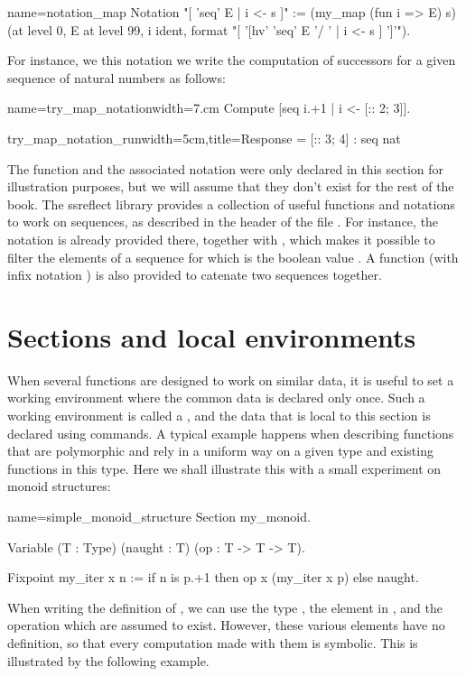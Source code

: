 \begin{coq}{name=notation_map}{}
Notation "[ 'seq' E | i <- s ]" := (my_map (fun i => E) s)
  (at level 0, E at level 99, i ident,
   format "[ '[hv' 'seq' E '/ ' | i <- s  ] ']'").
\end{coq}
For instance, we this notation we write the computation of successors
for a given sequence of natural numbers as follows:

\begin{coq}{name=try_map_notation}{width=7.cm}
Compute [seq i.+1 | i <- [:: 2; 3]].
\end{coq}
\begin{coqout}{try_map_notation_run}{width=5cm,title=Response}
= [:: 3; 4] : seq nat
\end{coqout}
The function  and the associated notation were only declared
in this section for illustration purposes, but we will assume that
they don't exist for the rest of the book.  The ssreflect library
provides a collection of useful functions and notations to work on
sequences, as described in the header of the file .  For
instance, the notation \C{[seq F | i <- s]} is already provided there,
together with \C{[seq i | i < s | p]}, which makes it possible to
filter the elements of a sequence for which  is the boolean
value .  A function  (with infix notation \C{++}) is
also provided to catenate two sequences together.

\section{Sections and local environments}
When several functions are designed to work on similar data, it is
useful to set a working environment where the common data is declared
only once.  Such a working environment is called a , and
the data that is local to this section is declared using 
commands.  A typical example happens when describing functions that
are polymorphic and rely in a uniform way on a given type and existing
functions in this type.  Here we shall illustrate this with a small
experiment on monoid structures:

\begin{coq}{name=simple_monoid_structure}{}
Section my_monoid.

Variable (T : Type) (naught : T) (op : T -> T -> T).

Fixpoint my_iter x n :=
  if n is p.+1 then op x (my_iter x p) else naught.
\end{coq}
When writing the definition of , we can use the type
, the element in , and the operation  which are
assumed to exist.  However, these various elements have no
definition, so that every computation made with them is symbolic.
This is illustrated by the following example.

